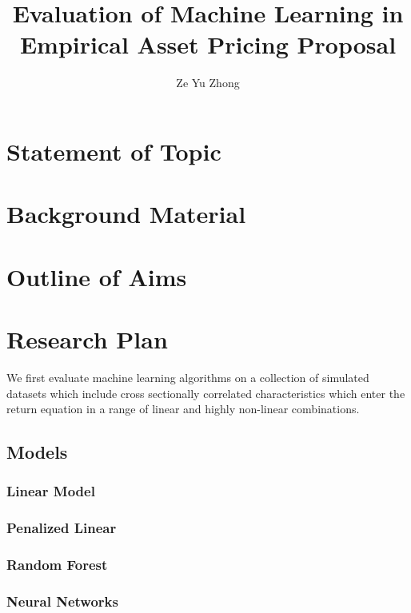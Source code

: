 \documentclass[man, a4paper, biblatex]{article}
\title{Evaluation of Machine Learning in Empirical Asset Pricing Proposal}
\author{Ze Yu Zhong}
\begin{document}
\maketitle


\section{Statement of Topic}

\section{Background Material}


\section{Outline of Aims}



\section{Research Plan}

We first evaluate machine learning algorithms on a collection of simulated datasets which include cross sectionally correlated characteristics which enter the return equation in a range of linear and highly non-linear combinations.

\subsection{Models}

\subsubsection{Linear Model}

\subsubsection{Penalized Linear}

\subsubsection{Random Forest}

\subsubsection{Neural Networks}
\end{document}
